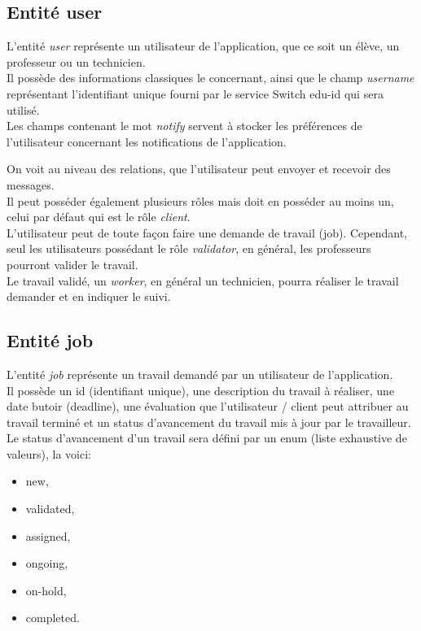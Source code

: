 \documentclass[
    iai, %
    il, %
]{heig-tb}
\begin{document}
\subsection{Entité user}
L'entité \emph{user} représente un utilisateur de l'application, que ce soit un élève, un professeur ou un technicien.\\
Il possède des informations classiques le concernant, ainsi que le champ \emph{username} représentant l'identifiant unique fourni par le service Switch edu-id qui sera utilisé.\\
Les champs contenant le mot \emph{notify} servent à stocker les préférences de l'utilisateur concernant les notifications de l'application.

On voit au niveau des relations, que l'utilisateur peut envoyer et recevoir des messages.\\
Il peut posséder également plusieurs rôles mais doit en posséder au moins un, celui par défaut qui est le rôle \emph{client}.\\
L'utilisateur peut de toute façon faire une demande de travail (job). Cependant, seul les utilisateurs possédant le rôle \emph{validator}, en général, les professeurs pourront valider le travail.\\
Le travail validé, un \emph{worker}, en général un technicien, pourra réaliser le travail demander et en indiquer le suivi.

\subsection{Entité job}
L'entité \emph{job} représente un travail demandé par un utilisateur de l'application.\\
Il possède un id (identifiant unique), une description du travail à réaliser, une date butoir (deadline), une évaluation que l'utilisateur / client peut attribuer au travail terminé et un status d'avancement du travail mis à jour par le travailleur.\\
Le status d'avancement d'un travail sera défini par un enum (liste exhaustive de valeurs), la voici:
\begin{itemize}
    \item new,
    \item validated,
    \item assigned,
    \item ongoing,
    \item on-hold,
    \item completed.
\end{itemize}
\end{document}
